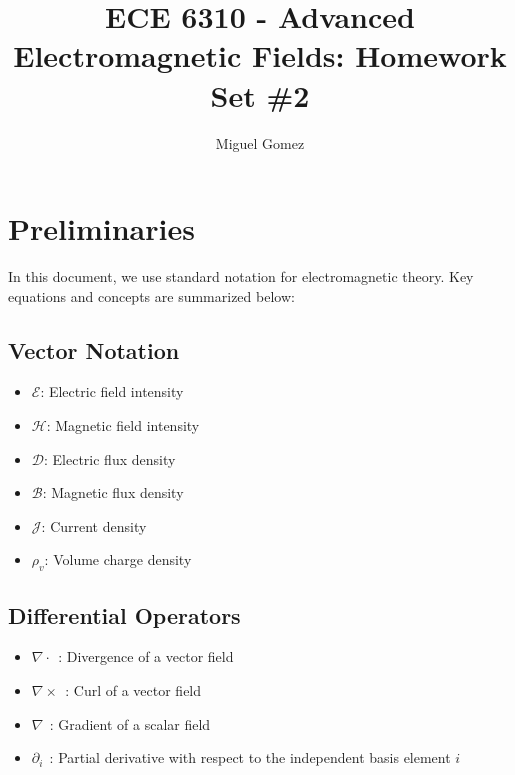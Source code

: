 \documentclass[12pt]{article}
\newcommand{\TimeUntilDue}{
  \ifnum\daystilldue<4
    \textcolor{red}{
    \number\daystilldue\ days - 
    \number\hourstilldue\ hours - 
    \number\minutestilldue\ min until deadline!!
  }
\else
    \number\daystilldue\ days - 
    \number\hourstilldue\ hours - 
    \number\minutestilldue\ min until deadline
  \fi
}
\begin{document}
\newcommand{\Cross}[2]{
\hat a_x(#1_2#2_3 -#1_3#2_2) -\hat a_y(#1_1#2_3-#1_3#2_1) + \hat a_z(#1_1#2_2-#1_2#2_1) 
}
\title{ECE 6310 - Advanced Electromagnetic Fields: Homework Set \#2}
\author{Miguel Gomez}
\maketitle

\section{Preliminaries}

In this document, we use standard notation for electromagnetic theory. Key equations and concepts are summarized below:

\subsection*{Vector Notation}
\begin{itemize}
  \item $\bm{\mathcal{E}}$: Electric field intensity
  \item $\bm{\mathcal{H}}$: Magnetic field intensity
  \item $\bm{\mathcal{D}}$: Electric flux density
  \item $\bm{\mathcal{B}}$: Magnetic flux density
  \item $\bm{\mathcal{J}}$: Current density
  \item $\rho_v$: Volume charge density
\end{itemize}

\subsection*{Differential Operators}
\begin{itemize}
  \item $\nabla \cdot\ \ $: Divergence of a vector field
  \item $\nabla \times\ \ $: Curl of a vector field
  \item $\nabla\ \ $: Gradient of a scalar field
  \item $\partial_i\ \ $: Partial derivative with respect to the independent basis element $i$
\end{itemize}
\end{document}
